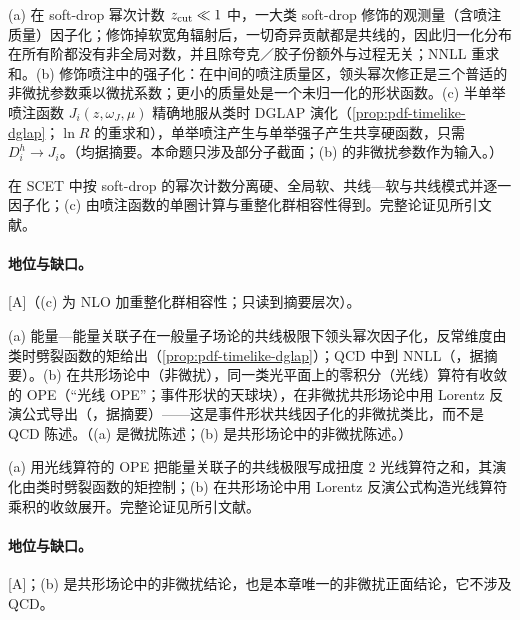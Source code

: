 \begin{proposition}\label{prop:front-jet-substructure}
(a) 在 soft-drop 幂次计数 $z_{\rm cut}\ll1$ 中，一大类 soft-drop 修饰的观测量（含喷注质量）因子化；修饰掉软宽角辐射后，一切奇异贡献都是共线的，因此归一化分布在所有阶都没有非全局对数，并且除夸克／胶子份额外与过程无关；NNLL 重求和\cite{Frye:2016aiz}。(b) 修饰喷注中的强子化：在中间的喷注质量区，领头幂次修正是三个普适的非微扰参数乘以微扰系数；更小的质量处是一个未归一化的形状函数\cite{Hoang:2019ceu}。(c) 半单举喷注函数 $J_i(z,\omega_J,\mu)$ 精确地服从类时 DGLAP 演化（\cref{prop:pdf-timelike-dglap}；$\ln R$ 的重求和），单举喷注产生与单举强子产生共享硬函数，只需 $D_i^h\to J_i$\cite{Kang:2016mcy}。（均据摘要。本命题只涉及部分子截面；(b) 的非微扰参数作为输入。）
\end{proposition}

\begin{proofsketch}
在 SCET 中按 soft-drop 的幂次计数分离硬、全局软、共线—软与共线模式并逐一因子化；(c) 由喷注函数的单圈计算与重整化群相容性得到。完整论证见所引文献。
\end{proofsketch}

\paragraph{地位与缺口。}[A]（(c) 为 NLO 加重整化群相容性；只读到摘要层次）。

\begin{proposition}\label{prop:front-lightray-ope}
(a) 能量—能量关联子在一般量子场论的共线极限下领头幂次因子化，反常维度由类时劈裂函数的矩给出（\cref{prop:pdf-timelike-dglap}）；QCD 中到 NNLL（\cite{Dixon:2019uzg}，据摘要）。(b) 在共形场论中（非微扰），同一类光平面上的零积分（光线）算符有收敛的 OPE（“光线 OPE”；事件形状的天球块），在非微扰共形场论中用 Lorentz 反演公式导出（\cite{Kologlu:2019mfz}，据摘要）——这是事件形状共线因子化的非微扰类比，而不是 QCD 陈述。（(a) 是微扰陈述；(b) 是共形场论中的非微扰陈述。）
\end{proposition}

\begin{proofsketch}
(a) 用光线算符的 OPE 把能量关联子的共线极限写成扭度 2 光线算符之和，其演化由类时劈裂函数的矩控制；(b) 在共形场论中用 Lorentz 反演公式构造光线算符乘积的收敛展开。完整论证见所引文献。
\end{proofsketch}

\paragraph{地位与缺口。}[A]；(b) 是共形场论中的非微扰结论，也是本章唯一的非微扰正面结论，它不涉及 QCD。
